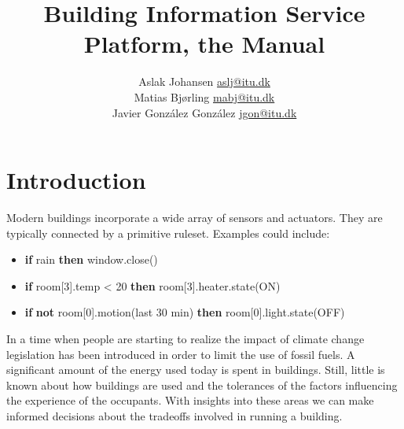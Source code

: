 \documentclass[10pt]{article}
\title{Building Information Service Platform, the Manual\\\scalebox{0.85}{a Discrete Event Simulator for Building Modeling}}
\author{Aslak Johansen \url{aslj@itu.dk}\\Matias Bjørling \url{mabj@itu.dk}\\Javier González González \url{jgon@itu.dk}}
\begin{document}
\maketitle
\tableofcontents
\newpage





\section{Introduction}

Modern buildings incorporate a wide array of sensors and actuators. They are typically connected by a primitive ruleset. Examples could include:
\begin{itemize}
  \item \textbf{if} rain \textbf{then} window.close()
  \item \textbf{if} room[3].temp < 20 \textbf{then} room[3].heater.state(ON)
  \item \textbf{if} \textbf{not} room[0].motion(last 30 min) \textbf{then} room[0].light.state(OFF)
\end{itemize}

In a time when people are starting to realize the impact of climate change legislation has been introduced in order to limit the use of fossil fuels. A significant amount of the energy used today is spent in buildings. Still, little is known about how buildings are used and the tolerances of the factors influencing the experience of the occupants. With insights into these areas we can make informed decisions about the tradeoffs involved in running a building.
\end{document}
